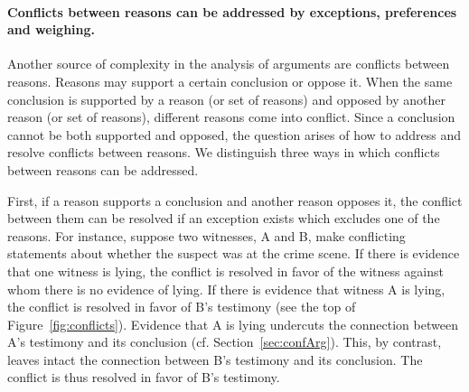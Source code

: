 \documentclass[10pt]{article}
\begin{document}
\paragraph{Conflicts between reasons can be addressed by exceptions, preferences and weighing.} 
Another source of complexity in the analysis of arguments are conflicts between reasons. 
Reasons may support a certain conclusion or oppose it.
When the same conclusion is supported by a reason (or set of reasons) 
and opposed by another reason (or set of reasons),
different reasons come into conflict. Since a conclusion cannot 
be both supported and opposed, the question arises of how to address and resolve conflicts between reasons. 
We distinguish three ways in which conflicts between reasons can be addressed. 

First, if a reason supports a conclusion and another reason opposes it, the conflict between them can be resolved if an exception exists which 
excludes one of the reasons. For instance, suppose two witnesses, A and B, make conflicting statements about 
whether the suspect was at the crime scene. If there is evidence that one witness is lying, 
the conflict is resolved in favor of the witness against whom there is no evidence of lying. 
If there is evidence that witness A is lying, 
the conflict is resolved in favor of B's testimony (see the top of Figure~\ref{fig:conflicts}). %
 Evidence that A is lying 
undercuts the connection between A's testimony and its conclusion (cf. Section~\ref{sec:confArg}). %
This, by contrast, 
leaves intact the connection between B's testimony and its conclusion. The conflict 
is thus resolved in favor of B's testimony. 



\end{document}
